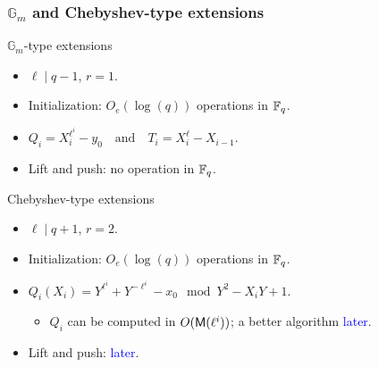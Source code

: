 \documentclass[10pt]{beamer}
\begin{document}
\begin{frame}
	\frametitle{$\mathbb{G}_m$ and Chebyshev-type extensions}
	
	\begin{exampleblock}{$\mathbb{G}_m$-type extensions}
		\begin{itemize}
			\item $\ell \mid q-1$, $r = 1$.
			\item Initialization: $O_e(\log(q))$ operations in $\mathbb{F}_q$.
			\item $Q_i=X_i^{\ell^i}-y_0 \quad\text{and}\quad T_i=X_{i}^\ell-X_{i-1}$.
			\item Lift and push: no operation in $\mathbb{F}_q$.
		\end{itemize}
	\end{exampleblock}
	
	\vspace*{3mm}
	\begin{exampleblock}{Chebyshev-type extensions}
		\begin{itemize}
			\item $\ell \mid q + 1$, $r = 2$.
			\item Initialization: $O_e(\log(q))$ operations in $\mathbb{F}_q$.
			\item $Q_i(X_i) = Y^{\ell^i} + Y^{-\ell^i} - x_0 \mod Y^2-X_iY+1$.
			\begin{itemize}
				\item $Q_i$ can be computed in $O(\mathsf{M}(\ell^i))$; a better algorithm \textcolor{blue}{later}.
			\end{itemize}
			\item Lift and push: \textcolor{blue}{later}.
		\end{itemize}
	\end{exampleblock}
	
\end{frame}

\end{document}
